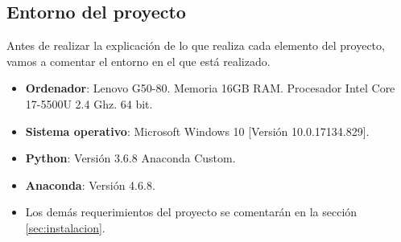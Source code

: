 \subsection{Entorno del proyecto}
Antes de realizar la explicación de lo que realiza cada elemento del proyecto, vamos a comentar el entorno en el que está realizado.
\begin{itemize}
\item \textbf{Ordenador}: Lenovo G50-80. Memoria 16GB RAM. Procesador Intel Core 17-5500U 2.4 Ghz. 64 bit.
\item \textbf{Sistema operativo}: Microsoft Windows 10 [Versión 10.0.17134.829].
\item \textbf{Python}: Versión 3.6.8 Anaconda Custom.
\item \textbf{Anaconda}: Versión 4.6.8.
\item Los demás requerimientos del proyecto se comentarán en la sección \ref{sec:instalacion}.
\end{itemize}

